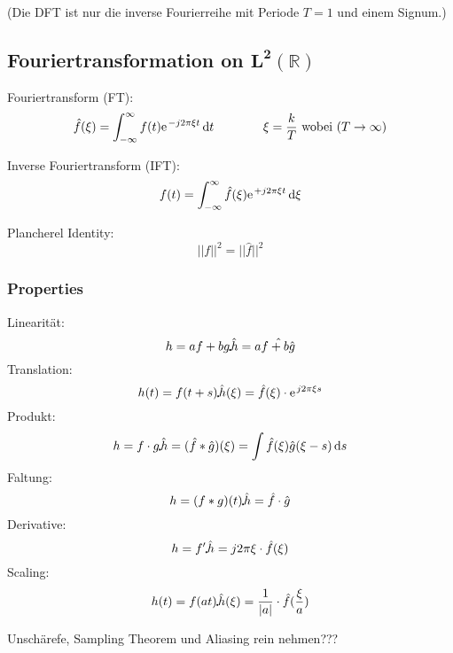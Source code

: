 (Die DFT ist nur die inverse Fourierreihe mit Periode $T=1$ und einem Signum.)

\subsection{Fouriertransformation on $\mathbf{L^2(\mathbb{R})}$}

Fouriertransform (FT): \[ \hat{f}(\xi) = \int_{-\infty}^{\infty}f(t) \e^{-j 2\pi \xi t} \, \mathrm{d}t \qquad \qquad \xi = \frac{k}{T} \text{ wobei } (T \rightarrow \infty) \]

Inverse Fouriertransform (IFT): \[ f(t) = \int_{-\infty}^{\infty}\hat{f}(\xi) \e^{+j 2\pi \xi t} \, \mathrm{d}\xi \]

Plancherel Identity: \[ ||f||^2 = ||\hat{f}||^2 \]

\subsubsection{Properties}
Linearität: \[ h = af + bg \FT \hat{h} = a\hat{f + b\hat{g}} \]
Translation: \[ h(t) = f(t+s) \FT \hat{h}(\xi) = \hat{f}(\xi) \cdot \e^{j2\pi\xi s} \]
Produkt: \[ h = f \cdot g \FT \hat{h} = (\hat{f}\ast\hat{g})(\xi) = \int \hat{f}(\xi) \hat{g}(\xi - s) \,\mathrm{d}s \]
Faltung: \[ h = (f\ast g)(t) \FT \hat{h} = \hat{f} \cdot \hat{g} \]
Derivative: \[ h = f' \FT \hat{h} = j2\pi\xi\cdot\hat{f}(\xi) \]
Scaling: \[ h(t) = f(at) \FT \hat{h}(\xi) = \frac{1}{|a|} \cdot \hat{f}(\frac{\xi}{a}) \]

Unschärefe, Sampling Theorem und Aliasing rein nehmen???
